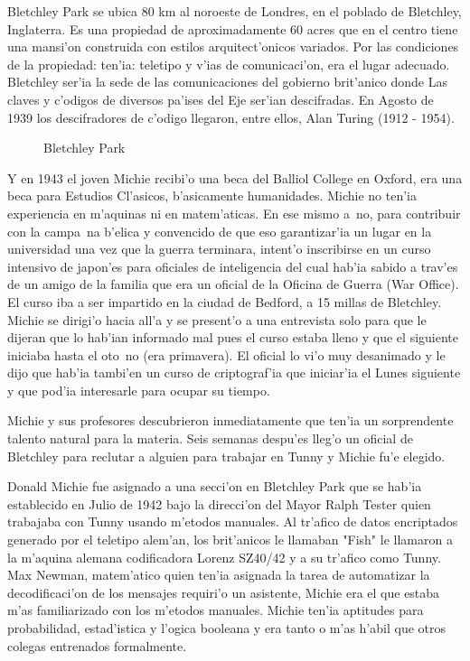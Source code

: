 \documentclass[11pt]{article}
\begin{document}
Bletchley Park se ubica 80 km al noroeste de Londres, en el poblado de Bletchley, Inglaterra. Es una propiedad de aproximadamente 60 acres que en el centro tiene una mansi'on construida con estilos arquitect'onicos variados. Por las condiciones de la propiedad: ten'ia: teletipo y v'ias de comunicaci'on, era el lugar adecuado. Bletchley ser'ia la sede de las comunicaciones del gobierno brit'anico donde Las claves y c'odigos de diversos pa'ises del Eje ser'ian descifradas. En Agosto de 1939 los descifradores de c'odigo llegaron, entre ellos, Alan Turing (1912 - 1954). 

\begin{figure}[h]

\centering
{}
\caption[Bletchley Park]{Bletchley Park} 
\label{fig:bp}

\end{figure}

\medskip

Y en 1943 el joven Michie recibi'o una beca del Balliol College en Oxford, era una beca para Estudios Cl'asicos, b'asicamente humanidades. Michie no ten'ia experiencia en m'aquinas ni en matem'aticas. En ese mismo a~no, para contribuir con la campa~na b'elica y convencido de que eso garantizar'ia un lugar en la universidad una vez que la guerra terminara, intent'o inscribirse en un curso intensivo de japon'es para oficiales de inteligencia del cual hab'ia sabido a trav'es de un amigo de la familia que era un oficial de la Oficina de Guerra (War Office). El curso iba a ser impartido en la ciudad de Bedford, a 15 millas de Bletchley. Michie se dirigi'o hacia all'a y se present'o a una entrevista solo para que le dijeran que lo hab'ian informado mal pues el curso estaba lleno y que el siguiente iniciaba hasta el oto~no (era primavera). El oficial lo vi'o muy desanimado y le dijo que hab'ia tambi'en un curso de criptograf'ia que iniciar'ia el Lunes siguiente y que pod'ia interesarle para ocupar su tiempo.

Michie y sus profesores descubrieron inmediatamente que ten'ia un sorprendente talento natural para la materia. Seis semanas despu'es lleg'o un oficial de Bletchley para reclutar a alguien para trabajar en Tunny y Michie fu'e elegido. 

Donald Michie fue asignado a una secci'on en Bletchley Park que se hab'ia establecido en Julio de 1942 bajo la direcci'on del Mayor Ralph Tester quien trabajaba con Tunny usando m'etodos manuales. Al tr'afico de datos encriptados generado por el teletipo alem'an, los brit'anicos le llamaban "Fish" le llamaron a la m'aquina alemana codificadora Lorenz SZ40/42 y a su tr'afico como Tunny. Max Newman, matem'atico quien ten'ia asignada la tarea de automatizar la decodificaci'on de los mensajes requiri'o un asistente, Michie era el que estaba m'as familiarizado con los m'etodos manuales. Michie ten'ia aptitudes para probabilidad, estad'istica y l'ogica booleana y era tanto o m'as h'abil que otros colegas entrenados formalmente.
\end{document}
